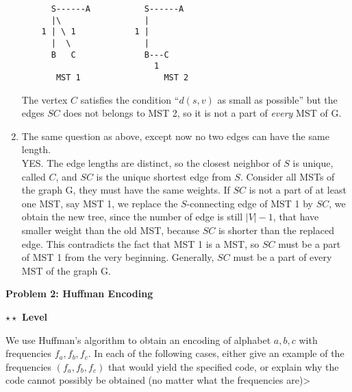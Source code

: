 \documentclass{article}\usepackage[utf8]{inputenc}
\begin{document}
\begin{enumerate}
\begin{lstlisting}
	  S------A           S------A
	  |\                 |
	1 | \ 1            1 |
	  |  \               |
	  B   C              B---C
	                       1
	   MST 1                 MST 2
\end{lstlisting}
%
The vertex $C$ satisfies the condition ``$d(s,v)$ as small as possible'' but the edges $SC$ does not belongs to MST 2, so it is not a part of \textit{every} MST of G.\\
\EndSolution
\item The same question as above, except now no two edges can have the same length.
\BeginSolution %
\\
YES. The edge lengths are distinct, so the closest neighbor of $S$ is unique, called $C$, and $SC$ is the unique shortest edge from $S$. Consider all MSTs of the graph G, they must have the same weights. If $SC$ is not a part of at least one MST, say MST 1, we replace the $S$-connecting edge of MST 1 by $SC$, we obtain the new tree, since the number of edge is still $|V| - 1$, that have smaller weight than the old MST, because $SC$ is shorter than the replaced edge. This contradicts the fact that MST 1 is a MST, so $SC$ must be a part of MST 1 from the very beginning. Generally, $SC$ must be a part of every MST of the graph G.
\EndSolution
\end{enumerate}

\clearpage

\vspace{-2mm}\noindent\begin{mybox}{\begin{center}\textbf{\color{black}Problem 2: Huffman Encoding}\end{center}}\end{mybox}\vspace{-2mm}
\begin{myboxot}\noindent\textbf{$\star\star$ Level}\end{myboxot}

\noindent We use Huffman's algorithm to obtain an encoding of alphabet ${a, b, c}$ with frequencies $f_a,f_b,f_c$. In each of the following cases, either give an example of the frequencies $(f_a, f_b, f_c)$ that would yield the specified code, or explain why the code cannot possibly be obtained (no matter what the frequencies are)>
\end{document}
